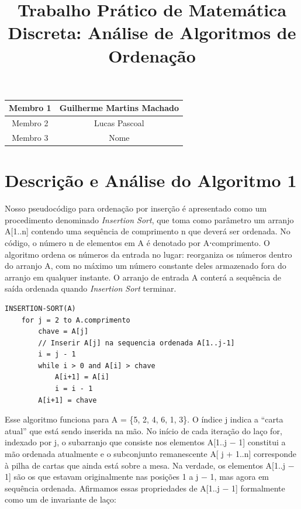 \documentclass{article}
\title{\bfseries{Trabalho Prático de Matemática Discreta: Análise de Algoritmos de Ordenação}}
\renewcommand\texttt[1]{{\ttfamily\color{GruvOrange}#1}}
\begin{document}
\maketitle

\begin{center}
\begin{tabular} {c c}
  \hline
  Membro 1 & Guilherme Martins Machado \\ [1ex]
  \hline
  Membro 2 & Lucas Pascoal \\ [1ex]
  \hline
  Membro 3 & Nome \\ [1ex]
  \hline
\end{tabular}
\end{center}

\section{Descrição e Análise do Algoritmo 1}

Nosso pseudocódigo para ordenação por inserção é apresentado como um procedimento denominado \textit{Insertion Sort}, que toma como parâmetro um arranjo \texttt{A[1..n]} contendo uma sequência de comprimento \texttt{n} que deverá ser ordenada. No código, o número \texttt{n} de elementos em \texttt{A} é denotado por \texttt{A⋅comprimento}. O algoritmo ordena os números da entrada no lugar: reorganiza os números dentro do arranjo \texttt{A}, com no máximo um número constante deles armazenado fora do arranjo em qualquer instante. O arranjo de entrada A conterá a sequência de saída ordenada quando \textit{Insertion Sort} terminar.

\begin{verbatim}
INSERTION-SORT(A)
    for j = 2 to A.comprimento
        chave = A[j]
        // Inserir A[j] na sequencia ordenada A[1..j-1]
        i = j - 1
        while i > 0 and A[i] > chave
            A[i+1] = A[i]
            i = i - 1
        A[i+1] = chave
\end{verbatim}

Esse algoritmo funciona para \texttt{A = \{5, 2, 4, 6, 1, 3\}}. O índice \texttt{j} indica a ``carta atual'' que está sendo inserida na mão. No início de cada iteração do laço \texttt{for}, indexado por \texttt{j}, o subarranjo que consiste nos elementos \texttt{A[1..j − 1]} constitui a mão ordenada atualmente e o subconjunto remanescente \texttt{A[ j + 1..n]} corresponde à pilha de cartas que ainda está sobre a mesa. Na verdade, os elementos \texttt{A[1..j − 1]} são os que estavam originalmente nas posições 1 a \texttt{j − 1}, mas agora em sequência ordenada. Afirmamos essas propriedades de \texttt{A[1..j − 1]} formalmente como um de invariante de laço:
\end{document}
